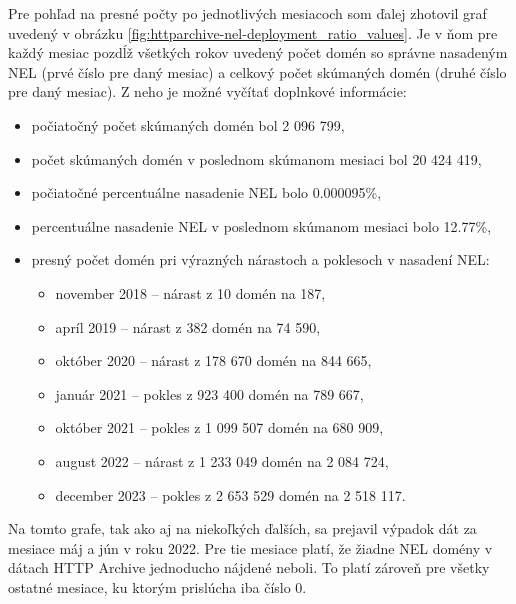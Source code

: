Pre pohľad na presné počty po jednotlivých mesiacoch som ďalej zhotovil graf uvedený v obrázku \ref{fig:httparchive-nel-deployment_ratio_values}.
Je v ňom pre každý mesiac pozdĺž všetkých rokov uvedený počet domén so správne nasadeným NEL (prvé číslo pre daný mesiac) a celkový počet skúmaných domén (druhé číslo pre daný mesiac). 
Z neho je možné vyčítať doplnkové informácie:
\begin{itemize}
    \item počiatočný počet skúmaných domén bol 2 096 799, 
    \item počet skúmaných domén v poslednom skúmanom mesiaci bol 20 424 419,
    \item počiatočné percentuálne nasadenie NEL bolo 0.000095\%,
    \item percentuálne nasadenie NEL v poslednom skúmanom mesiaci bolo 12.77\%,
    \item presný počet domén pri výrazných nárastoch a poklesoch v nasadení NEL:
    \begin{itemize}
        \item november 2018 -- nárast z 10 domén na 187,
        \item apríl 2019 -- nárast z 382 domén na 74 590,
        \item október 2020 -- nárast z 178 670 domén na 844 665,
        \item január 2021 -- pokles z 923 400 domén na 789 667,
        \item október 2021 -- pokles z 1 099 507 domén na 680 909,
        \item august 2022 -- nárast z 1 233 049 domén na 2 084 724,
        \item december 2023 -- pokles z 2 653 529 domén na 2 518 117.
    \end{itemize}
\end{itemize}

Na tomto grafe, tak ako aj na niekoľkých ďalších, sa prejavil výpadok dát za mesiace máj a jún v roku 2022.
Pre tie mesiace platí, že žiadne NEL domény v dátach HTTP Archive jednoducho nájdené neboli. 
To platí zároveň pre všetky ostatné mesiace, ku ktorým prislúcha iba číslo 0.

